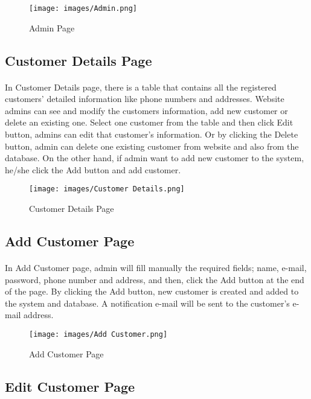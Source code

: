 \documentclass[12pt]{article}
\begin{document}
\bigskip
\bigskip
\bigskip
\begin{figure}[h]
\centerline{\texttt{[image: images/Admin.png]}}
\caption{Admin Page}
\label{fig}
\end{figure}

\newpage
\subsection{Customer Details Page}
\bigskip
\paragraph{}
In Customer Details page, there is a table that contains all the registered customers' detailed information like phone numbers and addresses. Website admins can see and modify the customers information, add new customer or delete an existing one. Select one customer from the table and then click Edit button, admins can edit that customer's information. Or by clicking the Delete button, admin can delete one existing customer from website and also from the database. On the other hand, if admin want to add new customer to the system, he/she click the Add button and add customer. 
\bigskip
\bigskip
\bigskip
\begin{figure}[h]
\centerline{\texttt{[image: images/Customer Details.png]}}
\caption{Customer Details Page}
\label{fig}
\end{figure}

\newpage
\subsection{Add Customer Page}
\bigskip
\paragraph{}
In Add Customer page, admin will fill manually the required fields; name, e-mail, password, phone number and address, and then, click the Add button at the end of the page. By clicking the Add button, new customer is created and added to the system and database. A notification e-mail will be sent to the customer's e-mail address. 
\bigskip
\bigskip
\bigskip
\begin{figure}[h]
\centerline{\texttt{[image: images/Add Customer.png]}}
\caption{Add Customer Page}
\label{fig}
\end{figure}

\newpage
\subsection{Edit Customer Page}
\bigskip
\end{document}
